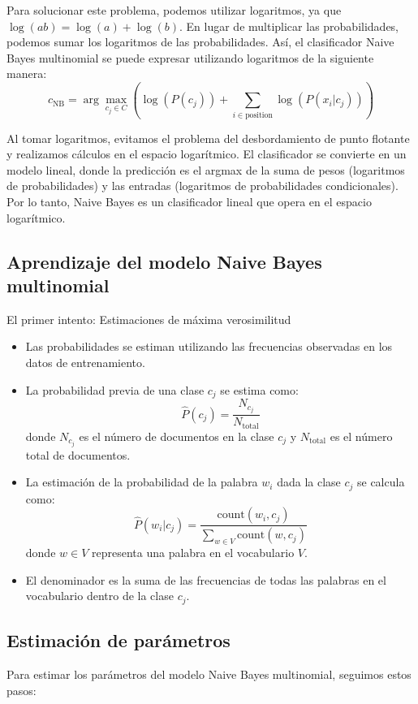Para solucionar este problema, podemos utilizar logaritmos, ya que $\log(ab) = \log(a) + \log(b)$. En lugar de multiplicar las probabilidades, podemos sumar los logaritmos de las probabilidades. Así, el clasificador Naive Bayes multinomial se puede expresar utilizando logaritmos de la siguiente manera:
\[
c_{\text{NB}} = \arg\max_{c_j \in C} \left(\log(P(c_j)) + \sum_{i \in \text{position}} \log(P(x_i | c_j))\right)
\]

Al tomar logaritmos, evitamos el problema del desbordamiento de punto flotante y realizamos cálculos en el espacio logarítmico. El clasificador se convierte en un modelo lineal, donde la predicción es el argmax de la suma de pesos (logaritmos de probabilidades) y las entradas (logaritmos de probabilidades condicionales). Por lo tanto, Naive Bayes es un clasificador lineal que opera en el espacio logarítmico.

\subsection{Aprendizaje del modelo Naive Bayes multinomial}

El primer intento: Estimaciones de máxima verosimilitud
\begin{itemize}
    \item Las probabilidades se estiman utilizando las frecuencias observadas en los datos de entrenamiento.
    \item La probabilidad previa de una clase $c_j$ se estima como:
    \[
    \hat{P}(c_j) = \frac{N_{c_j}}{N_{\text{total}}}
    \]
    donde $N_{c_j}$ es el número de documentos en la clase $c_j$ y $N_{\text{total}}$ es el número total de documentos.
    \item La estimación de la probabilidad de la palabra $w_i$ dada la clase $c_j$ se calcula como:
    \[
    \hat{P}(w_i | c_j) = \frac{{\text{count}(w_i, c_j)}}{\sum_{w\in V}{\text{count}(w, c_j)}}
    \]
    donde $w \in V$ representa una palabra en el vocabulario $V$.
    \item El denominador es la suma de las frecuencias de todas las palabras en el vocabulario dentro de la clase $c_j$.
\end{itemize}

\subsection{Estimación de parámetros}

Para estimar los parámetros del modelo Naive Bayes multinomial, seguimos estos pasos:

